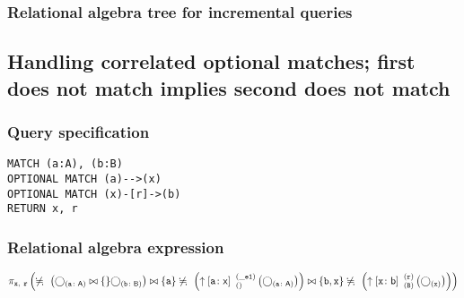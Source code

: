 \subsubsection*{Relational algebra tree for incremental queries}


\subsection{Handling correlated optional matches; first does not match implies second does not match}

\subsubsection*{Query specification}

\begin{lstlisting}
MATCH (a:A), (b:B)
OPTIONAL MATCH (a)-->(x)
OPTIONAL MATCH (x)-[r]->(b)
RETURN x, r
\end{lstlisting}

\subsubsection*{Relational algebra expression}

$\projection{\var{x},~\var{r}} \left(\alldifferent{} \left(\getvertices{a}{A} \join \{\} \getvertices{b}{B}\right) \join \{\var{a}\} \alldifferent{} \left(\expandout{a}{x}{}{\_e1}{} \left(\getvertices{a}{A}\right)\right) \join \{\var{b}, \var{x}\} \alldifferent{} \left(\expandout{x}{b}{B}{r}{} \left(\getvertices{x}{}\right)\right)\right)$

